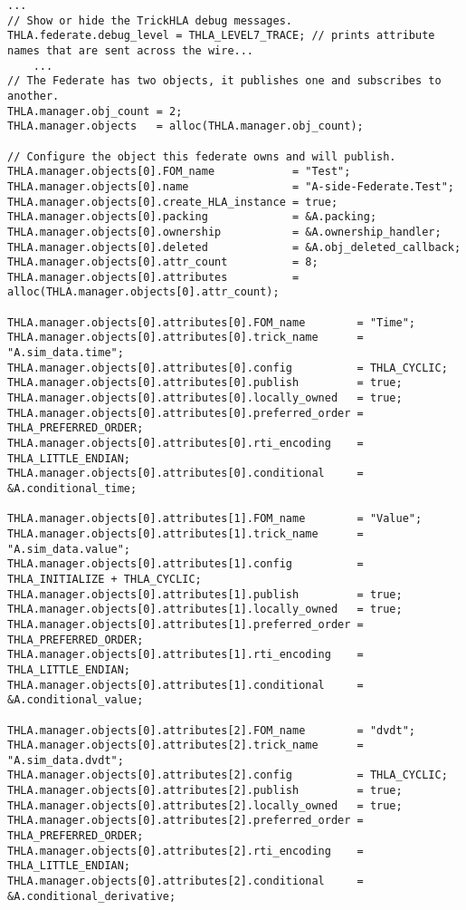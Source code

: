 \begin{lstlisting}[numbers=none,caption={Conditional {\tt input} file changes},label={list:sine-conditional-input-changes}]
    ...
// Show or hide the TrickHLA debug messages.
THLA.federate.debug_level = THLA_LEVEL7_TRACE; // prints attribute names that are sent across the wire...
    ...
// The Federate has two objects, it publishes one and subscribes to another.
THLA.manager.obj_count = 2;
THLA.manager.objects   = alloc(THLA.manager.obj_count);

// Configure the object this federate owns and will publish.
THLA.manager.objects[0].FOM_name            = "Test";
THLA.manager.objects[0].name                = "A-side-Federate.Test";
THLA.manager.objects[0].create_HLA_instance = true;
THLA.manager.objects[0].packing             = &A.packing;
THLA.manager.objects[0].ownership           = &A.ownership_handler;
THLA.manager.objects[0].deleted             = &A.obj_deleted_callback;
THLA.manager.objects[0].attr_count          = 8;
THLA.manager.objects[0].attributes          = alloc(THLA.manager.objects[0].attr_count);

THLA.manager.objects[0].attributes[0].FOM_name        = "Time";
THLA.manager.objects[0].attributes[0].trick_name      = "A.sim_data.time";
THLA.manager.objects[0].attributes[0].config          = THLA_CYCLIC;
THLA.manager.objects[0].attributes[0].publish         = true;
THLA.manager.objects[0].attributes[0].locally_owned   = true;
THLA.manager.objects[0].attributes[0].preferred_order = THLA_PREFERRED_ORDER;
THLA.manager.objects[0].attributes[0].rti_encoding    = THLA_LITTLE_ENDIAN;
THLA.manager.objects[0].attributes[0].conditional     = &A.conditional_time;

THLA.manager.objects[0].attributes[1].FOM_name        = "Value";
THLA.manager.objects[0].attributes[1].trick_name      = "A.sim_data.value";
THLA.manager.objects[0].attributes[1].config          = THLA_INITIALIZE + THLA_CYCLIC;
THLA.manager.objects[0].attributes[1].publish         = true;
THLA.manager.objects[0].attributes[1].locally_owned   = true;
THLA.manager.objects[0].attributes[1].preferred_order = THLA_PREFERRED_ORDER;
THLA.manager.objects[0].attributes[1].rti_encoding    = THLA_LITTLE_ENDIAN;
THLA.manager.objects[0].attributes[1].conditional     = &A.conditional_value;

THLA.manager.objects[0].attributes[2].FOM_name        = "dvdt";
THLA.manager.objects[0].attributes[2].trick_name      = "A.sim_data.dvdt";
THLA.manager.objects[0].attributes[2].config          = THLA_CYCLIC;
THLA.manager.objects[0].attributes[2].publish         = true;
THLA.manager.objects[0].attributes[2].locally_owned   = true;
THLA.manager.objects[0].attributes[2].preferred_order = THLA_PREFERRED_ORDER;
THLA.manager.objects[0].attributes[2].rti_encoding    = THLA_LITTLE_ENDIAN;
THLA.manager.objects[0].attributes[2].conditional     = &A.conditional_derivative;


\end{lstlisting}
